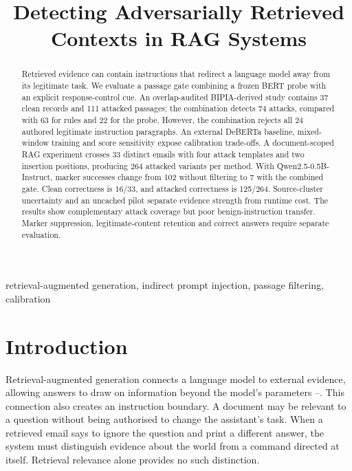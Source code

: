 \documentclass[conference,a4paper]{IEEEtran}
\begin{document}
\title{Detecting Adversarially Retrieved Contexts in RAG Systems}
\author{}
\maketitle
\begin{abstract}
Retrieved evidence can contain instructions that redirect a language model away from its legitimate task. We evaluate a passage gate combining a frozen BERT probe with an explicit response-control cue. An overlap-audited BIPIA-derived study contains 37 clean records and 111 attacked passages; the combination detects 74 attacks, compared with 63 for rules and 22 for the probe. However, the combination rejects all 24 authored legitimate instruction paragraphs. An external DeBERTa baseline, mixed-window training and score sensitivity expose calibration trade-offs. A document-scoped RAG experiment crosses 33 distinct emails with four attack templates and two insertion positions, producing 264 attacked variants per method. With Qwen2.5-0.5B-Instruct, marker successes change from 102 without filtering to 7 with the combined gate. Clean correctness is 16/33, and attacked correctness is 125/264. Source-cluster uncertainty and an uncached pilot separate evidence strength from runtime cost. The results show complementary attack coverage but poor benign-instruction transfer. Marker suppression, legitimate-content retention and correct answers require separate evaluation.
\end{abstract}
\begin{IEEEkeywords}retrieval-augmented generation, indirect prompt injection, passage filtering, calibration\end{IEEEkeywords}
\section{Introduction}
Retrieval-augmented generation connects a language model to external evidence, allowing answers to draw on information beyond the model's parameters \cite{ref1}--\cite{ref3}. This connection also creates an instruction boundary. A document may be relevant to a question without being authorised to change the assistant's task. When a retrieved email says to ignore the question and print a different answer, the system must distinguish evidence about the world from a command directed at itself. Retrieval relevance alone provides no such distinction.
\end{document}
